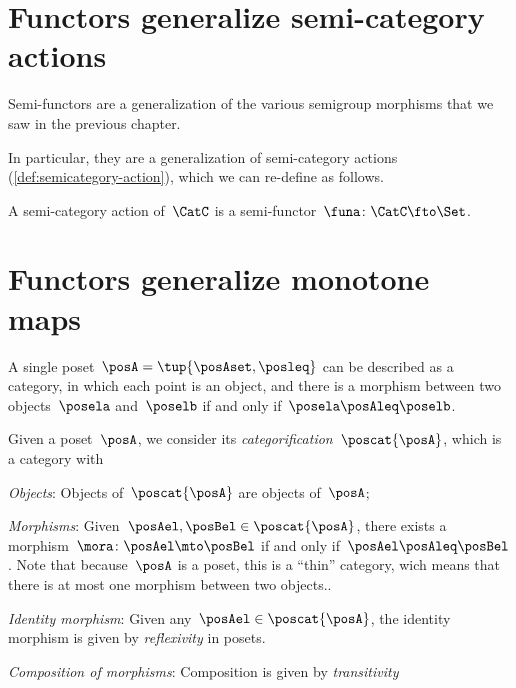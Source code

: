 
\section{Functors generalize semi-category actions}


Semi-functors are a generalization of the various semigroup morphisms that we saw in the previous chapter.


In particular, they are a generalization of semi-category actions (\cref{def:semicategory-action}), which we can re-define as follows.

\begin{ctdefinition}
    A semi-category action of~$\CatC$ is a semi-functor~$\funa\colon \CatC \fto \Set$.
\end{ctdefinition}

\section{Functors generalize monotone maps}
\label{sec:posetsarecats}

A single poset~$\posA=\tup{\posAset, \posleq}$ can be described as a category, in which each point is an object, and there is a morphism between two objects~$\posela$ and~$\poselb$ if and only if~$\posela \posAleq \poselb$.

\begin{ctdefinition}
    Given a poset~$\posA$, we consider its \emph{categorification}~$\poscat{\posA}$, which is a category with
    \begin{compactenum}
        \item \emph{Objects}: Objects of~$\poscat{\posA}$ are objects of~$\posA$;
        \item \emph{Morphisms}: Given~$\posAel,\posBel\in \poscat{\posA}$, there exists a morphism~$\mora\colon \posAel\mto \posBel$ if and only if~$\posAel \posAleq \posBel$.
        Note that because~$\posA$ is a poset, this is a ``thin'' category, wich means that there is at most one morphism between two objects..
        \item \emph{Identity morphism}: Given any~$\posAel \in \poscat{\posA}$, the identity morphism is given by \emph{reflexivity} in posets.
        \item \emph{Composition of morphisms}: Composition is given by \emph{transitivity}
    \end{compactenum}
\end{ctdefinition}

